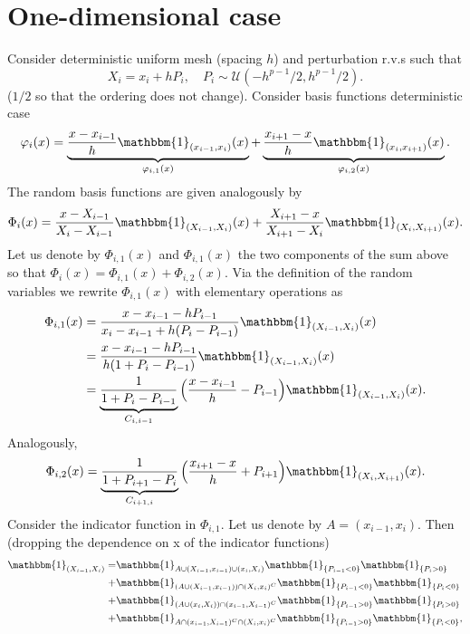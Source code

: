 \documentclass{siamart1116}
\numberwithin{theorem}{section}
\renewcommand{\phi}{\varphi}
\newcommand{\ind}[1]{\mathbbm{1}_{#1}}
\begin{document}
\section{One-dimensional case} Consider deterministic uniform mesh (spacing $h$) and perturbation r.v.s  such that
\begin{equation}
	X_i = x_i + hP_i, \quad P_i \sim \mathcal{U}(-h^{p-1}/2, h^{p-1}/2).
\end{equation}
($1/2$ so that the ordering does not change). Consider basis functions deterministic case
\begin{equation}
	\phi_i(x) =	\underbrace{\frac{x - x_{i-1}}{h} \ind{(x_{i-1}, x_i)}(x)}_{\phi_{i,1}(x)} 
	          + \underbrace{\frac{x_{i+1} - x}{h} \ind{(x_i, x_{i+1})}(x)}_{\phi_{i,2}(x)} .
\end{equation}
The random basis functions are given analogously by
\begin{equation}
	\Phi_i(x) =	\frac{x - X_{i-1}}{X_i - X_{i-1}} \ind{(X_{i-1},X_i)}(x) + \frac{X_{i+1} - x}{X_{i+1} - X_i}\ind{(X_i, X_{i+1})}(x). 
\end{equation}
Let us denote by $\Phi_{i,1}(x)$ and $\Phi_{i,1}(x)$ the two components of the sum above so that $\Phi_i(x) = \Phi_{i, 1}(x) + \Phi_{i, 2}(x)$. Via the definition of the random variables we rewrite $\Phi_{i, 1}(x)$ with elementary operations as 
\begin{equation}\label{eq:BasisFctBeforeIndFct}
\begin{aligned}
	\Phi_{i, 1}(x) &= \frac{x - x_{i-1} - hP_{i-1}}{x_i - x_{i-1} + h(P_i - P_{i-1})}\ind{(X_{i-1},X_i)}(x) \\
	&= \frac{x - x_{i-1} - hP_{i-1}}{h(1 + P_i - P_{i-1})}\ind{(X_{i-1},X_i)}(x) \\
	&= \underbrace{\frac{1}{1 + P_i - P_{i-1}}}_{C_{i,i-1}}\Big(\frac{x - x_{i-1}}{h} - P_{i-1}\Big)\ind{(X_{i-1},X_i)}(x).
\end{aligned}
\end{equation}
Analogously,
\begin{equation}
	\Phi_{i, 2}(x) =  \underbrace{\frac{1}{1 + P_{i+1} - P_i}}_{C_{i+1, i}}\Big(\frac{x_{i+1} - x}{h} + P_{i+1}\Big)\ind{(X_i,X_{i+1})}(x).
\end{equation}
Consider the indicator function in $\Phi_{i, 1}$. Let us denote by $A = (x_{i-1}, x_i)$. Then (dropping the dependence on x of the indicator functions)
\begin{equation}
\begin{aligned}
\ind{(X_{i-1}, X_i)} = &\ind{A\cup (X_{i-1}, x_{i-1}) \cup (x_i, X_i)}\ind{\{P_{i-1} < 0\}}\ind{\{P_i > 0\}} \\
					 + &\ind{(A \cup (X_{i-1}, x_{i-1})) \cap (X_i, x_i)^C}\ind{\{P_{i-1} < 0\}}\ind{\{P_i < 0\}} \\
					 + &\ind{(A \cup (x_i, X_i)) \cap (x_{i-1}, X_{i-1})^C}\ind{\{P_{i-1} > 0\}}\ind{\{P_i > 0\}} \\
					 + &\ind{A \cap (x_{i-1}, X_{i-1})^C \cap (X_i, x_i)^C}\ind{\{P_{i-1} > 0\}}\ind{\{P_i < 0\}},
\end{aligned}
\end{equation}
\end{document}
